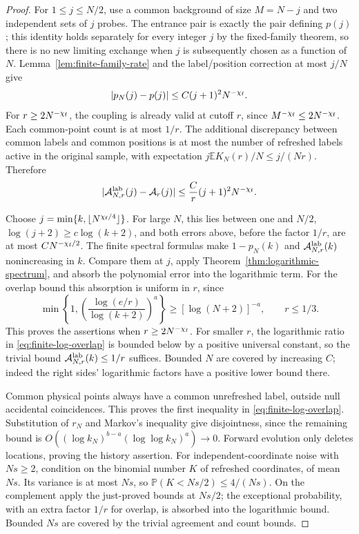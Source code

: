\documentclass[11pt,letterpaper]{article}
\newcommand{\PP}{\mathbb P}\newcommand{\EE}{\mathbb E}
\begin{document}
\begin{proof}
For $1\le j\le N/2$, use a common background of size $M=N-j$
and two independent sets of $j$ probes. The entrance pair is exactly
the pair defining $p(j)$; this identity holds separately for every
integer $j$ by the fixed-family theorem, so there is no new limiting
exchange when $j$ is subsequently chosen as a function of $N$.
Lemma~\ref{lem:finite-family-rate} and the label/position correction
at most $j/N$ give
\begin{equation}\label{eq:finite-profile-rate}
 |p_N(j)-p(j)|\le C(j+1)^2 N^{-\chi_{\rm f}}.
\end{equation}
For $r\ge2N^{-\chi_{\rm f}}$, the coupling is already valid at
cutoff $r$, since $M^{-\chi_{\rm f}}\le2N^{-\chi_{\rm f}}$.
Each common-point count is at most $1/r$. The additional discrepancy
between common labels and common positions is at most the number
of refreshed labels active in the original sample, with expectation
$j\EE K_N(r)/N\le j/(Nr)$. Therefore
\begin{equation}\label{eq:finite-overlap-rate}
 |\mathcal A^{\rm lab}_{N,r}(j)-\mathcal A_r(j)|
       \le \frac Cr(j+1)^2N^{-\chi_{\rm f}}.
\end{equation}

Choose $j=\min\{k,\lfloor N^{\chi_{\rm f}/4}\rfloor\}$.
For large $N$, this lies between one and $N/2$,
$\log(j+2)\ge c\log(k+2)$, and both errors above, before the
factor $1/r$, are at most $CN^{-\chi_{\rm f}/2}$.
The finite spectral formulas make $1-p_N(k)$ and
$\mathcal A^{\rm lab}_{N,r}(k)$ nonincreasing in $k$.
Compare them at $j$, apply Theorem~\ref{thm:logarithmic-spectrum},
and absorb the polynomial error into the logarithmic term. For the
overlap bound this absorption is uniform in $r$, since
\[
 \min\left\{1,
    \left(\frac{\log(e/r)}{\log(k+2)}\right)^a\right\}
       \ge [\log(N+2)]^{-a},\qquad r\le1/3.
\]
This proves the assertions when $r\ge2N^{-\chi_{\rm f}}$.
For smaller $r$, the logarithmic ratio in
\eqref{eq:finite-log-overlap} is bounded below by a positive universal
constant, so the trivial bound $\mathcal A^{\rm lab}_{N,r}(k)\le1/r$
suffices. Bounded $N$ are covered by increasing $C$; indeed the
right sides' logarithmic factors have a positive lower bound there.

Common physical points always have a common unrefreshed label,
outside null accidental coincidences. This proves the first inequality
in \eqref{eq:finite-log-overlap}. Substitution of $r_N$ and Markov's
inequality give disjointness, since the remaining bound is
$O((\log k_N)^{b-a}(\log\log k_N)^a)\to0$.
Forward evolution only deletes locations, proving the history assertion.
For independent-coordinate noise with $Ns\ge2$, condition on the binomial number
$K$ of refreshed coordinates, of mean $Ns$. Its variance is at most
$Ns$, so $\PP(K<Ns/2)\le4/(Ns)$. On the complement apply the
just-proved bounds at $Ns/2$; the exceptional probability, with an
extra factor $1/r$ for overlap, is absorbed into the logarithmic bound.
Bounded $Ns$ are covered by the trivial agreement and count bounds.
\end{proof}
\end{document}
